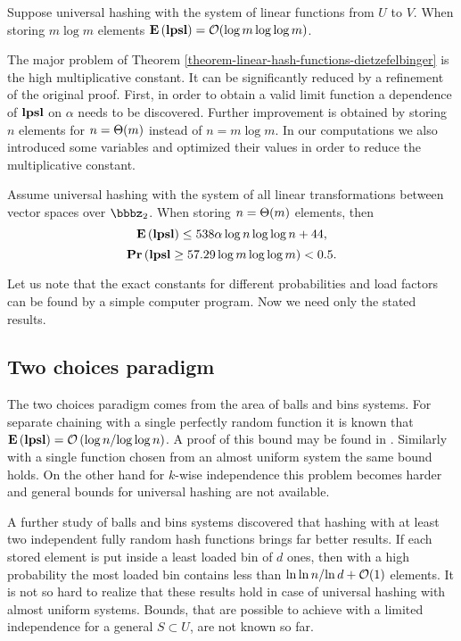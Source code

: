 \begin{theorem}
\label{theorem-linear-hash-functions-dietzefelbinger}
Suppose universal hashing with the system of linear functions from $U$ to $V$. When storing $m \log m$ elements $\mathbf{E}\left(\mathbf{lpsl}\right) = \mathcal{O}(\log m \log \log m)$. 
\end{theorem}

The major problem of Theorem \ref{theorem-linear-hash-functions-dietzefelbinger} is the high multiplicative constant. It can be significantly reduced by a refinement of the original proof. First, in order to obtain a valid limit function a dependence of $\mathbf{lpsl}$ on $\alpha$ needs to be discovered. Further improvement is obtained by storing $n$ elements for $n = \mathrm{\Theta}(m)$ instead of $n = m \log m$. In our computations we also introduced some variables and optimized their values in order to reduce the multiplicative constant.

\begin{theorem}
Assume universal hashing with the system of all linear transformations between vector spaces over $\bbbz_2$. When storing $n = \mathrm{\Theta}(m)$ elements, then $$\mathbf{E}\left(\mathbf{lpsl}\right) \leq 538 \alpha \log n \log \log n + 44,$$ $$\mathbf{Pr}\left(\mathbf{lpsl} \geq 57.29 \log m \log \log m\right) < 0.5.$$
\end{theorem}

Let us note that the exact constants for different probabilities and load factors can be found by a simple computer program. Now we need only the stated results.

\subsection{Two choices paradigm}
The two choices paradigm comes from the area of balls and bins systems. For separate chaining with a single perfectly random function it is known that $\mathbf{E}\left(\mathbf{lpsl}\right) = \mathcal{O}\left({\log n}/{\log \log n}\right)$. A proof of this bound may be found in \cite{DBLP:books/sp/Mehlhorn84}. Similarly with a single function chosen from an almost uniform system the same bound holds. On the other hand for $k$-wise independence this problem becomes harder and general bounds for universal hashing are not available.

A further study \cite{DBLP:conf/stoc/AzarBKU94} of balls and bins systems discovered that hashing with at least two independent fully random hash functions brings far better results. If each stored element is put inside a least loaded bin of $d$ ones, then with a high probability the most loaded bin contains less than ${\ln \ln n}/{\ln d} + \mathcal{O}(1)$ elements. It is not so hard to realize that these results hold in case of universal hashing with almost uniform systems. Bounds, that are possible to achieve with a limited independence for a general $S \subset U$, are not known so far.

